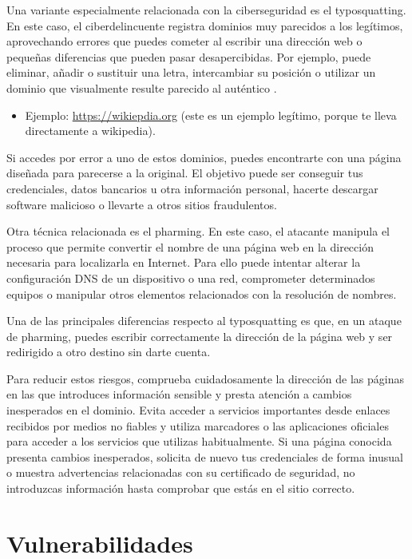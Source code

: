 \documentclass[
  spanish,
  a4paper,
  openany]{book}
\providecommand{\tightlist}{%
  \setlength{\itemsep}{0pt}\setlength{\parskip}{0pt}}
\begin{document}
Una variante especialmente relacionada con la ciberseguridad es el typosquatting. En este caso, el ciberdelincuente registra dominios muy parecidos a los legítimos, aprovechando errores que puedes cometer al escribir una dirección web o pequeñas diferencias que pueden pasar desapercibidas. Por ejemplo, puede eliminar, añadir o sustituir una letra, intercambiar su posición o utilizar un dominio que visualmente resulte parecido al auténtico \citep{WIKI-typosquatting}.

\begin{itemize}
\tightlist
\item
  Ejemplo: \url{https://wikiepdia.org} (este es un ejemplo legítimo, porque te lleva directamente a wikipedia).
\end{itemize}

Si accedes por error a uno de estos dominios, puedes encontrarte con una página diseñada para parecerse a la original. El objetivo puede ser conseguir tus credenciales, datos bancarios u otra información personal, hacerte descargar software malicioso o llevarte a otros sitios fraudulentos.

Otra técnica relacionada es el pharming. En este caso, el atacante manipula el proceso que permite convertir el nombre de una página web en la dirección necesaria para localizarla en Internet. Para ello puede intentar alterar la configuración DNS de un dispositivo o una red, comprometer determinados equipos o manipular otros elementos relacionados con la resolución de nombres.

Una de las principales diferencias respecto al typosquatting es que, en un ataque de pharming, puedes escribir correctamente la dirección de la página web y ser redirigido a otro destino sin darte cuenta.

Para reducir estos riesgos, comprueba cuidadosamente la dirección de las páginas en las que introduces información sensible y presta atención a cambios inesperados en el dominio. Evita acceder a servicios importantes desde enlaces recibidos por medios no fiables y utiliza marcadores o las aplicaciones oficiales para acceder a los servicios que utilizas habitualmente. Si una página conocida presenta cambios inesperados, solicita de nuevo tus credenciales de forma inusual o muestra advertencias relacionadas con su certificado de seguridad, no introduzcas información hasta comprobar que estás en el sitio correcto.

\section{Vulnerabilidades}\label{vulnerabilidades}
\end{document}
